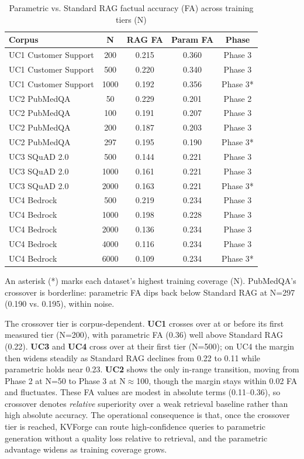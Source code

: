 \documentclass[10pt,twocolumn]{article}
\begin{document}
\begin{table}[htbp]
  \centering\small
  \caption{Parametric vs. Standard RAG factual accuracy (FA) across training tiers (N)}
  \label{tab:quality-matrix}
  \begin{tabularx}{\columnwidth}{Lcccc}
  \toprule
    Corpus & N & RAG FA & Param FA & Phase \\
  \midrule
  \midrule
  UC1 Customer Support & 200 & 0.215 & 0.360 & Phase 3 \\
  UC1 Customer Support & 500 & 0.220 & 0.340 & Phase 3 \\
  UC1 Customer Support & 1000 & 0.192 & 0.356 & Phase 3* \\
  UC2 PubMedQA & 50 & 0.229 & 0.201 & Phase 2 \\
  UC2 PubMedQA & 100 & 0.191 & 0.207 & Phase 3 \\
  UC2 PubMedQA & 200 & 0.187 & 0.203 & Phase 3 \\
  UC2 PubMedQA & 297 & 0.195 & 0.190 & Phase 3* \\
  UC3 SQuAD 2.0 & 500 & 0.144 & 0.221 & Phase 3 \\
  UC3 SQuAD 2.0 & 1000 & 0.161 & 0.221 & Phase 3 \\
  UC3 SQuAD 2.0 & 2000 & 0.163 & 0.221 & Phase 3* \\
  UC4 Bedrock & 500 & 0.219 & 0.234 & Phase 3 \\
  UC4 Bedrock & 1000 & 0.198 & 0.228 & Phase 3 \\
  UC4 Bedrock & 2000 & 0.136 & 0.234 & Phase 3 \\
  UC4 Bedrock & 4000 & 0.116 & 0.234 & Phase 3 \\
  UC4 Bedrock & 6000 & 0.109 & 0.234 & Phase 3* \\
  \bottomrule
  \end{tabularx}
\end{table}


An asterisk (*) marks each dataset's highest training coverage (N). PubMedQA's crossover is borderline: parametric FA dips back below Standard RAG at N=297 (0.190 vs. 0.195), within noise.


The crossover tier is corpus-dependent. \textbf{UC1} crosses over at or before its first measured tier (N=200), with parametric FA (0.36) well above Standard RAG (0.22). \textbf{UC3} and \textbf{UC4} cross over at their first tier (N=500); on UC4 the margin then widens steadily as Standard RAG declines from 0.22 to 0.11 while parametric holds near 0.23. \textbf{UC2} shows the only in-range transition, moving from Phase 2 at N=50 to Phase 3 at N$\approx$100, though the margin stays within 0.02 FA and fluctuates. These FA values are modest in absolute terms (0.11--0.36), so crossover denotes \textit{relative} superiority over a weak retrieval baseline rather than high absolute accuracy. The operational consequence is that, once the crossover tier is reached, KVForge can route high-confidence queries to parametric generation without a quality loss relative to retrieval, and the parametric advantage widens as training coverage grows.
\end{document}
